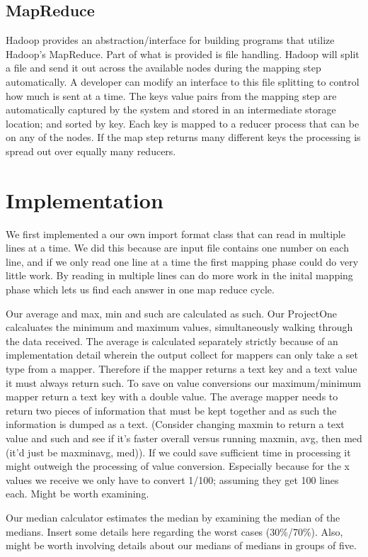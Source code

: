 \documentclass[11pt]{article}
\begin{document}
\subsection{MapReduce}
Hadoop provides an abstraction/interface for building programs that utilize Hadoop's MapReduce.  Part of what is provided is file handling.  Hadoop will split a file and send it out across the available nodes during the mapping step automatically.  A developer can modify an interface to this file splitting to control how much is sent at a time.  The keys value pairs from the mapping step are automatically captured by the system and stored in an intermediate storage location; and sorted by key.  Each key is mapped to a reducer process that can be on any of the nodes.  If the map step returns many different keys the processing is spread out over equally many reducers.

\section{Implementation}
We first implemented a our own import format class that can read in multiple lines at a time.  We did this because are input file contains one number on each line, and if we only read one line at a time the first mapping phase could do very little work.  By reading in multiple lines can do more work in the inital mapping phase which lets us find each answer in one map reduce cycle.

Our average and max, min and such are calculated as such.  Our ProjectOne calcaluates the minimum and maximum values, simultaneously walking through the data received.  The average is calculated separately strictly because of an implementation detail wherein the output collect for mappers can only take a set type from a mapper.  Therefore if the mapper returns a text key and a text value it must always return such.  To save on value conversions our maximum/minimum mapper return a text key with a double value.  The average mapper needs to return two pieces of information that must be kept together and as such the information is dumped as a text.  (Consider changing maxmin to return a text value and such and see if it's faster overall versus running maxmin, avg, then med (it'd just be maxminavg, med)).  If we could save sufficient time in processing it might outweigh the processing of value conversion.  Especially because for the x values we receive we only have to convert 1/100; assuming they get 100 lines each.  Might be worth examining.

Our median calculator estimates the median by examining the median of the medians.  Insert some details here regarding the worst cases (30\%/70\%).  Also, might be worth involving details about our medians of medians in groups of five.
\end{document}

